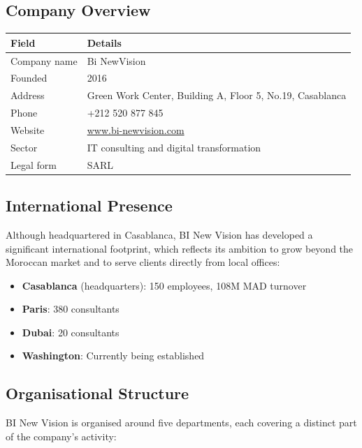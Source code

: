\documentclass[12pt, a4paper]{article}
\begin{document}
\subsection{Company Overview}

\vspace{0.5em}
\begin{tabularx}{\textwidth}{lX}
\toprule
\textbf{Field} & \textbf{Details} \\
\midrule
Company name  & Bi NewVision \\
Founded       & 2016 \\
Address       & Green Work Center, Building A, Floor 5, No.19, Casablanca \\
Phone         & +212 520 877 845 \\
Website       & \url{www.bi-newvision.com} \\
Sector        & IT consulting and digital transformation \\
Legal form    & SARL \\
\bottomrule
\end{tabularx}

\subsection{International Presence}

Although headquartered in Casablanca, BI New Vision has developed a significant international footprint, which reflects its ambition to grow beyond the Moroccan market and to serve clients directly from local offices:

\begin{itemize}
  \item \textbf{Casablanca} (headquarters): 150 employees, 108M MAD turnover
  \item \textbf{Paris}: 380 consultants
  \item \textbf{Dubai}: 20 consultants
  \item \textbf{Washington}: Currently being established
\end{itemize}

\subsection{Organisational Structure}

BI New Vision is organised around five departments, each covering a distinct part of the company's activity:
\end{document}
